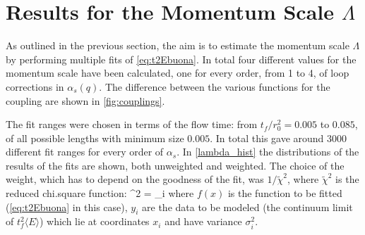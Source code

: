 \section{Results for the Momentum Scale $\Lambda$} 
As outlined in the previous section, the aim is to estimate the momentum scale $\Lambda$ by performing multiple fits of \cref{eq:t2Ebuona}. In total four different values for the momentum scale have been calculated, one for every order, from 1 to 4, of loop corrections in $\alpha_s(q)$. The difference between the various functions for the coupling are shown in \cref{fig:couplings}. 


The fit ranges were chosen in terms of the flow time: from $t_f/r_0^2 = 0.005$ to $0.085$, of all possible lengths with minimum size $0.005$. In total this gave around 3000 different fit ranges for every order of $\alpha_s$. In \cref{lambda_hist} the distributions of the results of the fits are shown, both unweighted and weighted. The choice of the weight, which has to depend on the goodness of the fit, was $1/\tilde\chi^2$, where $\tilde\chi^2$ is the reduced chi.square function:
\beq
\tilde\chi^2 =  \sum_i
\eeq
where $f(x)$ is the function to be fitted (\cref{eq:t2Ebuona} in this case), $y_i$ are the data to be modeled (the continuum limit of $t_f^2\langle E\rangle$) which lie at coordinates $x_i$ and have variance $\sigma_i^2$. 

